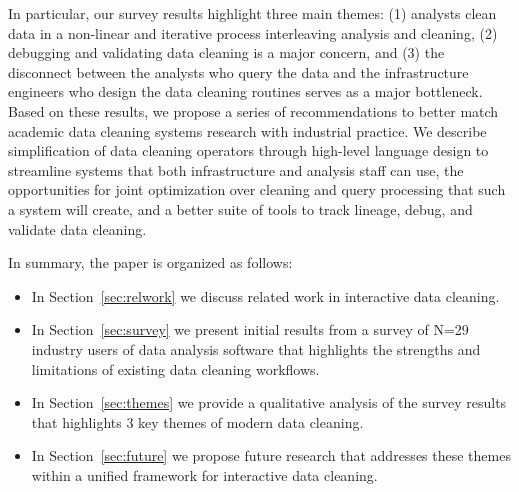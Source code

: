 In particular, our survey results highlight three main themes: (1) analysts clean data in a non-linear and iterative process interleaving analysis and cleaning, (2) debugging and validating data cleaning is a major concern, and (3) the disconnect between the analysts who query the data and the infrastructure engineers who design the data cleaning routines serves as a major bottleneck.
Based on these results, we propose a series of recommendations to better match academic data cleaning systems research with industrial practice.
We describe simplification of data cleaning operators through high-level language design to streamline systems that both infrastructure and analysis staff can use, the opportunities for joint optimization over cleaning and query processing that such a system will create, and a better suite of tools to track lineage, debug, and validate data cleaning. 






In summary, the paper is organized as follows:
\begin{itemize}
\item In Section~\ref{sec:relwork} we discuss related work in interactive data cleaning.
\item In Section~\ref{sec:survey} we present initial results from a survey of N=29 industry users of data analysis software that highlights the strengths and limitations of existing data cleaning workflows.
\item In Section~\ref{sec:themes} we provide a qualitative analysis of the survey results that highlights 3 key themes of modern data cleaning.
\item In Section~\ref{sec:future} we propose future research that addresses these themes within a unified framework for interactive data cleaning. 
\end{itemize}
